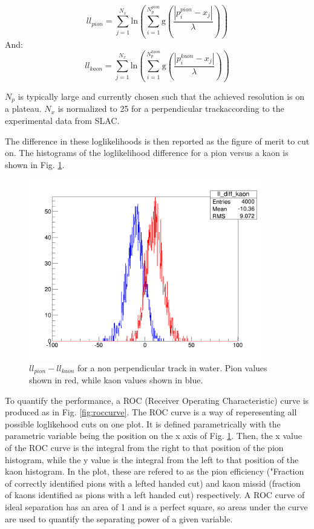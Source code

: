 \documentclass[11pt]{article}
\begin{document}
\begin{equation}
ll_{pion} = \sum\limits_{j=1}^{N_x} \textrm{ln}(\sum\limits_{i=1}^{N^{pion}_{p}} \textrm{g}(\frac{|p^{pion}_{i}-x_j|}{\lambda}))
\end{equation}
And:
\begin{equation}
ll_{kaon} = \sum\limits_{j=1}^{N_x} \textrm{ln}(\sum\limits_{i=1}^{N^{kaon}_{p}} \textrm{g}(\frac{|p^{kaon}_{i}-x_j|}{\lambda}))
\end{equation}

$N_p$ is typically large and currently chosen such that the achieved resolution is on a plateau.  $N_x$ is normalized to 25 for a perpendicular trackaccording to the experimental data from SLAC.

The difference in these loglikelihoods is then reported as the figure of merit to cut on.  The histograms of the loglikelihood difference for a pion versus a kaon is shown in Fig. \ref{fig:llhistos}.

\begin{figure}
\centering
\includegraphics[width=4in]{pngs/ll_diffs.png}
\caption{$ll_{pion} - ll_{kaon}$ for a non perpendicular track in water.  Pion values shown in red, while kaon values shown in blue. \label{fig:llhistos}}
\end{figure}

To quantify the performance, a ROC (Receiver Operating Characteristic) curve is produced as in Fig. \ref{fig:roccurve}.  The ROC curve is a way of reperesenting all possible loglikehood cuts on one plot.  It is defined parametrically with the parametric variable being the position on the x axis of Fig. \ref{fig:llhistos}.  Then, the x value of the ROC curve is the integral from the right to that position of the pion histogram, while the y value is the integral from the left to that position of the kaon histogram.  In the plot, these are refered to as the pion efficiency ("Fraction of correctly identified pions with a lefted handed cut) and kaon missid (fraction of kaons identified as pions with a left handed cut) respectively.  A ROC curve of ideal separation has an area of 1 and is a perfect square, so areas under the curve are used to quantify the separating power of a given variable.  
\end{document}
